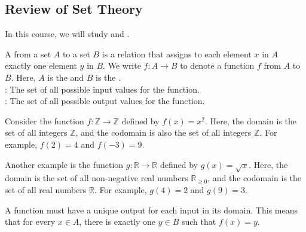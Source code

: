 \documentclass[11pt]{article}
\begin{document}
\subsection{Review of Set Theory}
In this course, we will study  and .\\

\begin{definition}
    A  from a set \( A \) to a set \( B \) is a relation that assigns to each element \( x \) in \( A \) exactly one element \( y \) in \( B \). We write \( f: A \to B \) to denote a function \( f \) from \( A \) to \( B \). Here, \( A \) is the  and \( B \) is the .\\
    : The set of all possible input values for the function.\\
    : The set of all possible output values for the function.
\end{definition}

\begin{example}
    Consider the function \( f: \mathbb{Z} \to \mathbb{Z} \) defined by \( f(x) = x^2 \). Here, the domain is the set of all integers \( \mathbb{Z} \), and the codomain is also the set of all integers \( \mathbb{Z} \). For example, \( f(2) = 4 \) and \( f(-3) = 9 \).
\end{example}

\begin{example}
    Another example is the function \( g: \mathbb{R} \to \mathbb{R} \) defined by \( g(x) = \sqrt{x} \). Here, the domain is the set of all non-negative real numbers \( \mathbb{R}_{\geq 0} \), and the codomain is the set of all real numbers \( \mathbb{R} \). For example, \( g(4) = 2 \) and \( g(9) = 3 \).
\end{example}

\begin{fact}
    A function must have a unique output for each input in its domain. This means that for every \( x \in A \), there is exactly one \( y \in B \) such that \( f(x) = y \).
\end{fact}

\begin{center}
\end{center}
\end{document}
